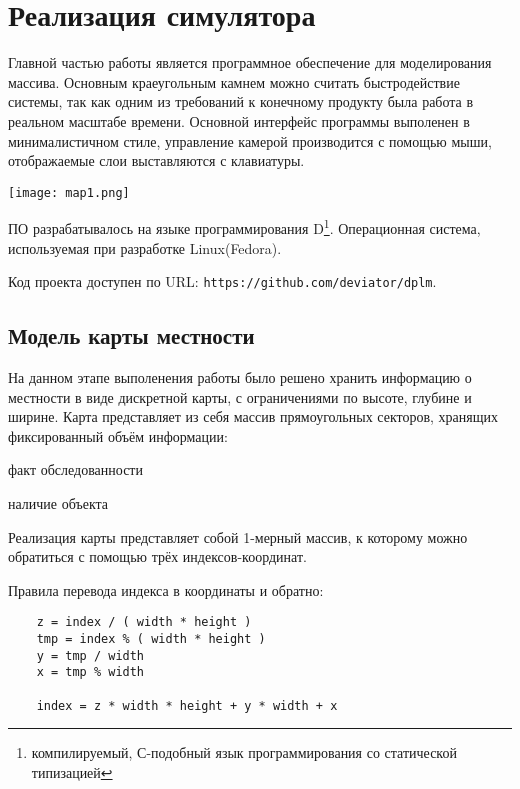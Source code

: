 \newpage
\section{Реализация симулятора}

Главной частью работы является программное обеспечение для моделирования
массива. Основным краеугольным камнем можно считать быстродействие системы, 
так как одним из требований к конечному продукту была работа в реальном масштабе
времени. Основной интерфейс программы выполенен в минималистичном стиле, управление
камерой производится с помощью мыши, отображаемые слои выставляются с клавиатуры.

\vspace{1em}

\texttt{[image: map1.png]}

ПО разрабатывалось на языке программирования D\footnote{компилируемый, С-подобный
язык программирования со статической типизацией}. Операционная система, используемая
при разработке Linux(Fedora).

Код проекта доступен по URL: \verb|https://github.com/deviator/dplm|.

\newpage
\subsection{Модель карты местности}

На данном этапе выполенения работы было решено хранить информацию о местности в
виде дискретной карты, с ограничениями по высоте, глубине и ширине. Карта
представляет из себя массив прямоугольных секторов, хранящих фиксированный объём
информации:
\begin{mintemize}
    \item факт обследованности
    \item наличие объекта
\end{mintemize}

Реализация карты представляет собой 1-мерный массив, к которому можно обратиться с помощью трёх
индексов-координат.

Правила перевода индекса в координаты и обратно:

\begin{verbatim}
    z = index / ( width * height )
    tmp = index % ( width * height )
    y = tmp / width
    x = tmp % width

    index = z * width * height + y * width + x
\end{verbatim}
\vspace{-0.5em}

